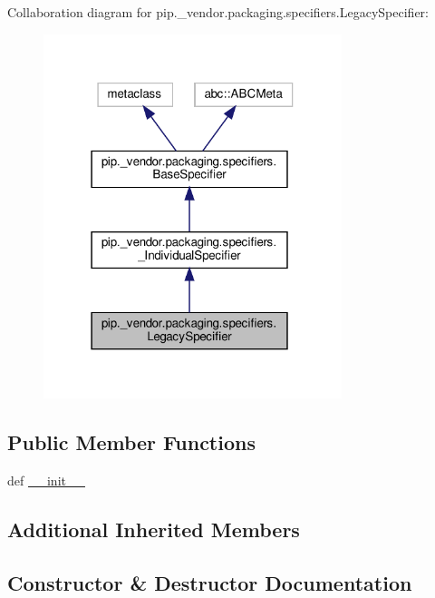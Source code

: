 Collaboration diagram for pip.\+\_\+vendor.\+packaging.\+specifiers.\+Legacy\+Specifier\+:
\nopagebreak
\begin{figure}[H]
\begin{center}
\leavevmode
\includegraphics[width=247pt]{classpip_1_1__vendor_1_1packaging_1_1specifiers_1_1LegacySpecifier__coll__graph}
\end{center}
\end{figure}
\subsection*{Public Member Functions}
\begin{DoxyCompactItemize}
\item 
def \hyperlink{classpip_1_1__vendor_1_1packaging_1_1specifiers_1_1LegacySpecifier_a7dec830cc93e4bfd21a6f23a3e5c66ff}{\+\_\+\+\_\+init\+\_\+\+\_\+}
\end{DoxyCompactItemize}
\subsection*{Additional Inherited Members}


\subsection{Constructor \& Destructor Documentation}
\mbox{\label{classpip_1_1__vendor_1_1packaging_1_1specifiers_1_1LegacySpecifier_a7dec830cc93e4bfd21a6f23a3e5c66ff}} 
